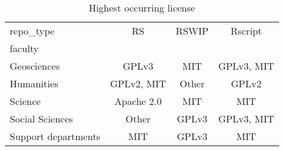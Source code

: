 \begin{table}
\centering
\caption{Highest occurring license}
\label{tab:highest_license}
\begin{tabular}{lccc}
\toprule
repo\_type &          RS &  RSWIP &     Rscript \\
faculty             &             &        &             \\
\midrule
Geosciences         &       GPLv3 &    MIT &  GPLv3, MIT \\
Humanities          &  GPLv2, MIT &  Other &       GPLv2 \\
Science             &  Apache 2.0 &    MIT &         MIT \\
Social Sciences     &       Other &  GPLv3 &  GPLv3, MIT \\
Support departments &         MIT &  GPLv3 &         MIT \\
\bottomrule
\end{tabular}
\end{table}

